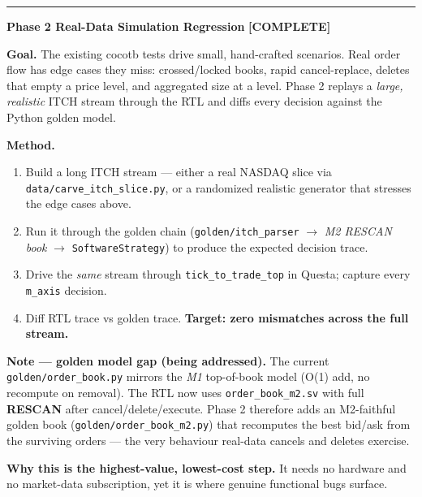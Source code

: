 \documentclass[10pt,a4paper]{article}
\newcommand{\sectionrule}{\vspace{2pt}\textcolor{rulegray}{\rule{\linewidth}{0.8pt}}\vspace{2pt}}
\begin{document}
\sectionrule

{\large\bfseries\color{hdrblue} Phase 2 \textendash{} Real-Data Simulation Regression\quad}%
{\large\color{okgreen}\textbf{[COMPLETE]}}

\textbf{Goal.} The existing cocotb tests drive small, hand-crafted scenarios.
Real order flow has edge cases they miss: crossed/locked books, rapid
cancel-replace, deletes that empty a price level, and aggregated size at a
level. Phase 2 replays a \emph{large, realistic} ITCH stream through the RTL and
diffs every decision against the Python golden model.

\textbf{Method.}
\begin{enumerate}[leftmargin=1.4em, itemsep=2pt]
  \item Build a long ITCH stream — either a real NASDAQ slice via
        \texttt{data/carve\_itch\_slice.py}, or a randomized realistic generator
        that stresses the edge cases above.
  \item Run it through the golden chain
        (\texttt{golden/itch\_parser} $\to$ \emph{M2 RESCAN book} $\to$
        \texttt{SoftwareStrategy}) to produce the expected decision trace.
  \item Drive the \emph{same} stream through \texttt{tick\_to\_trade\_top} in
        Questa; capture every \texttt{m\_axis} decision.
  \item Diff RTL trace vs golden trace. \textbf{Target: zero mismatches across
        the full stream.}
\end{enumerate}

\textbf{Note — golden model gap (being addressed).} The current
\texttt{golden/order\_book.py} mirrors the \emph{M1} top-of-book model (O(1) add,
no recompute on removal). The RTL now uses \texttt{order\_book\_m2.sv} with full
\textbf{RESCAN} after cancel/delete/execute. Phase 2 therefore adds an
M2-faithful golden book (\texttt{golden/order\_book\_m2.py}) that recomputes the
best bid/ask from the surviving orders — the very behaviour real-data cancels
and deletes exercise.

\textbf{Why this is the highest-value, lowest-cost step.} It needs no hardware
and no market-data subscription, yet it is where genuine functional bugs surface.
\end{document}
